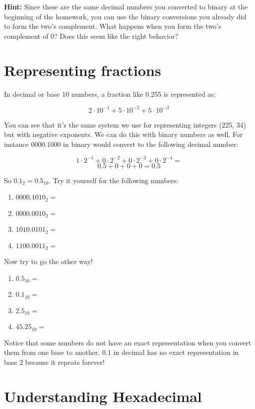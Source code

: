 \documentclass[a4paper,12pt]{article} %
\begin{document}
\noindent
\textbf{Hint:} Since these are the same decimal numbers you converted to binary at the beginning of the homework, you can use the binary conversions you already did to form the two's complement. What happens when you form the two's complement of 0? Does this seem like the right behavior?

\section{Representing fractions}

In decimal or base 10 numbers, a fraction like 0.255 is represented as:

$$2 \cdot 10^{-1} + 5 \cdot 10^{-2} + 5 \cdot 10^{-3}$$

\noindent
You can see that it's the same system we use for representing integers (225, 34) but with negative exponents. We can do this with binary numbers as well. For instance 0000.1000 in binary would convert to the following decimal number:

$$1 \cdot 2^{-1} + 0 \cdot 2^{-2} + 0 \cdot 2^{-3} + 0 \cdot 2^{-4} = $$
$$0.5 + 0 + 0 + 0 = 0.5$$

\clearpage

\noindent
So $0.1_{2} = 0.5_{10}$. Try it yourself for the following numbers:

\begin{enumerate}[resume]
\item $0000.1010_{2} = $
\item $0000.0010_{2} = $
\item $1010.0101_{2} = $
\item $1100.0011_{2} = $
\end{enumerate}

\noindent
Now try to go the other way!

\begin{enumerate}[resume]
\item $0.5_{10} = $
\item $0.1_{10} = $
\item $2.5_{10} = $
\item $45.25_{10} = $
\end{enumerate}

\noindent
Notice that some numbers do not have an exact representation when you convert them from one base to another. 0.1 in decimal has no exact representation in base 2 because it repeats forever! 

\section{Understanding Hexadecimal}
\end{document}
